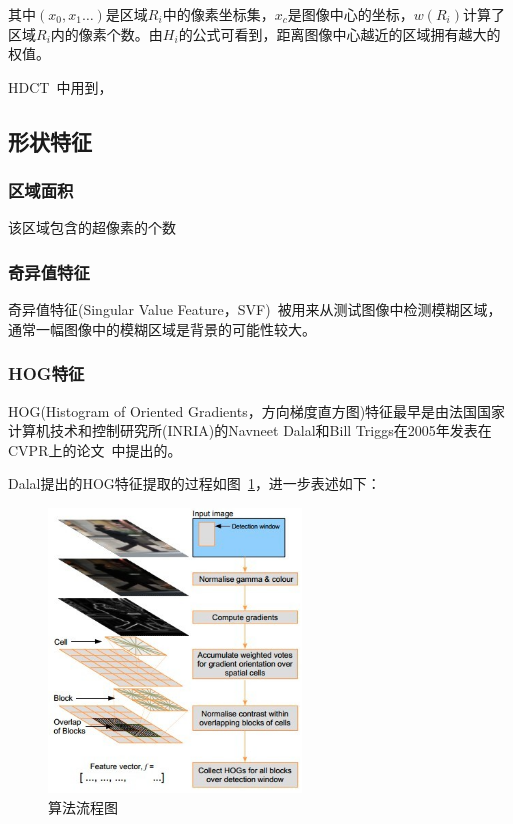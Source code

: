 \documentclass[12pt]{article}
\begin{document}
其中$(x_0, x_1 \ldots)$是区域$R_i$中的像素坐标集，$x_c$是图像中心的坐标，$w(R_i)$计算了区域$R_i$内的像素个数。由$H_i$的公式可看到，距离图像中心越近的区域拥有越大的权值。

HDCT~\cite{kim2014salient}中用到，

\subsection{形状特征}

\subsubsection{区域面积}

该区域包含的超像素的个数

\subsubsection{奇异值特征}

奇异值特征(Singular Value Feature，SVF)~\cite{su2011blurred}被用来从测试图像中检测模糊区域，通常一幅图像中的模糊区域是背景的可能性较大。

\subsubsection{HOG特征}

HOG(Histogram of Oriented Gradients，方向梯度直方图)特征最早是由法国国家计算机技术和控制研究所(INRIA)的Navneet Dalal和Bill Triggs在2005年发表在CVPR上的论文~\cite{dalal2005histograms}中提出的。

Dalal提出的HOG特征提取的过程如图~\ref{fig: HOG}，进一步表述如下：

\begin{figure}[!ht]
\centering
\includegraphics[width=0.6\textwidth]{HOG.png}
\caption{算法流程图}
\label{fig: HOG}
\end{figure} 
\end{document}
